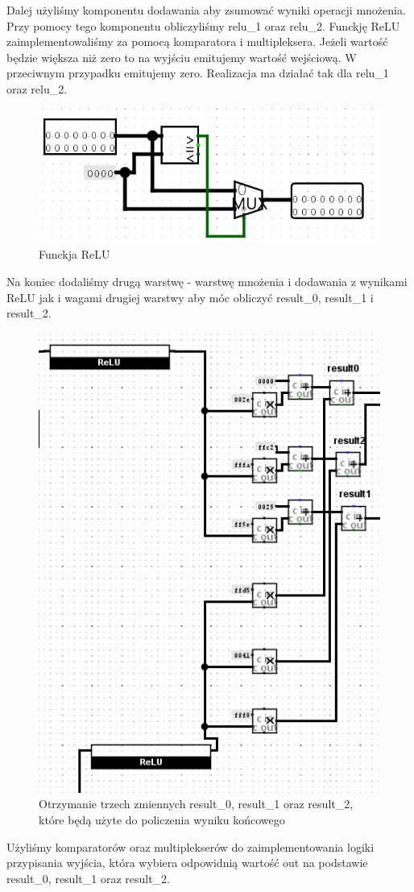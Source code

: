 \documentclass[a4paper, titleauthor]{mwart}
\begin{document}
Dalej użyliśmy komponentu dodawania aby zsumować wyniki operacji mnożenia. Przy pomocy tego komponentu obliczyliśmy relu\_1 oraz relu\_2.
\newline
Funckję ReLU zaimplementowaliśmy za pomocą komparatora i multipleksera. Jeżeli wartość będzie większa niż zero to na wyjściu emitujemy wartość wejściową.
W przeciwnym przypadku emitujemy zero. Realizacja ma działać tak dla  relu\_1 oraz relu\_2.

\begin{figure}[h!]
\centering
    \includegraphics[width=0.8\linewidth]{Relu.png}
    \caption{Funckja ReLU}
\end{figure}

Na koniec dodaliśmy drugą warstwę - warstwę mnożenia i dodawania z wynikami ReLU jak i  wagami drugiej warstwy aby móc obliczyć result\_0, result\_1 i result\_2.
\begin{figure}[h!]
\centering
    \includegraphics[width=0.5\linewidth]{Result.png}
    \caption{Otrzymanie trzech zmiennych result\_0, result\_1 oraz result\_2, które będą użyte do policzenia wyniku końcowego}
\end{figure}

\newpage
Użyliśmy komparatorów oraz multiplekserów do zaimplementowania logiki przypisania wyjścia, która wybiera odpowidnią wartość out na podstawie result\_0, result\_1 oraz result\_2.
\end{document}
